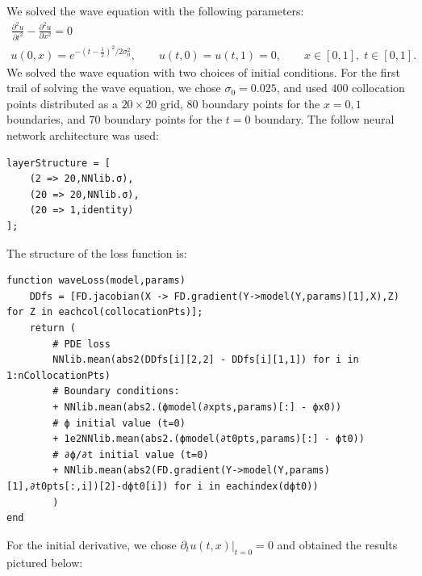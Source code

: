\documentclass[11pt]{article}
\newcommand{\1}{\mathbf 1}
\begin{document}
We solved the wave equation with the following parameters:
\begin{gather}
	\frac{\partial^2 u}{\partial t^2} - \frac{\partial^2 u}{\partial x^2}
	=0
	\\
	u(0,x) = e^{-(t - \tfrac{1}{2})^2/2 \sigma_0^2}, \qquad u(t,0)= u(t,1) = 0, \qquad x \in [0,1], \; t \in [0,1].
\end{gather}
We solved the wave equation with two choices of initial conditions.
For the first trail of solving the wave equation, we chose $\sigma_0 = 0.025$, and used $400$ collocation points distributed as a $20 \times 20$ grid, $80$ boundary points for the $x = 0,1$ boundaries, and $70$ boundary points for the $t = 0$ boundary.
The follow neural network architecture was used:
\begin{singlespace}
\begin{verbatim}
layerStructure = [
    (2 => 20,NNlib.σ),
    (20 => 20,NNlib.σ),
    (20 => 1,identity)
];
\end{verbatim}
The structure of the loss function is:
\begin{verbatim}
function waveLoss(model,params)
    DDfs = [FD.jacobian(X -> FD.gradient(Y->model(Y,params)[1],X),Z) for Z in eachcol(collocationPts)];
    return (
        # PDE loss
        NNlib.mean(abs2(DDfs[i][2,2] - DDfs[i][1,1]) for i in 1:nCollocationPts) 
        # Boundary conditions:
        + NNlib.mean(abs2.(ϕmodel(∂xpts,params)[:] - ϕx0)) 
        # ϕ initial value (t=0)
        + 1e2NNlib.mean(abs2.(ϕmodel(∂t0pts,params)[:] - ϕt0))
        # ∂ϕ/∂t initial value (t=0)
        + NNlib.mean(abs2(FD.gradient(Y->model(Y,params)[1],∂t0pts[:,i])[2]-dϕt0[i]) for i in eachindex(dϕt0))
        )
end
\end{verbatim}
\end{singlespace}
For the initial derivative, we chose $\left.\partial_t u(t,x)\right|_{t = 0} = 0$ and obtained the results pictured below:
\end{document}
